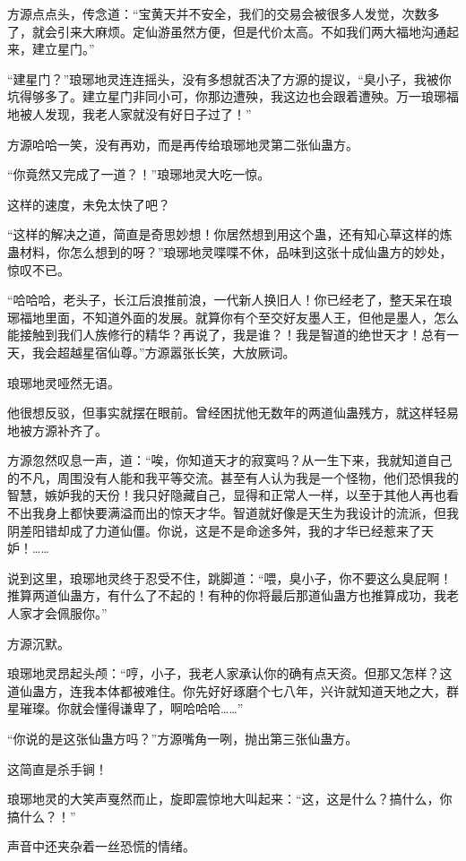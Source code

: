 \begin{this_body}
方源点点头，传念道：“宝黄天并不安全，我们的交易会被很多人发觉，次数多了，就会引来大麻烦。定仙游虽然方便，但是代价太高。不如我们两大福地沟通起来，建立星门。”

“建星门？”琅琊地灵连连摇头，没有多想就否决了方源的提议，“臭小子，我被你坑得够多了。建立星门非同小可，你那边遭殃，我这边也会跟着遭殃。万一琅琊福地被人发现，我老人家就没有好日子过了！”

方源哈哈一笑，没有再劝，而是再传给琅琊地灵第二张仙蛊方。

“你竟然又完成了一道？！”琅琊地灵大吃一惊。

这样的速度，未免太快了吧？

“这样的解决之道，简直是奇思妙想！你居然想到用这个蛊，还有知心草这样的炼蛊材料，你怎么想到的呀？”琅琊地灵喋喋不休，品味到这张十成仙蛊方的妙处，惊叹不已。

“哈哈哈，老头子，长江后浪推前浪，一代新人换旧人！你已经老了，整天呆在琅琊福地里面，不知道外面的发展。就算你有个至交好友墨人王，但他是墨人，怎么能接触到我们人族修行的精华？再说了，我是谁？！我是智道的绝世天才！总有一天，我会超越星宿仙尊。”方源嚣张长笑，大放厥词。

琅琊地灵哑然无语。

他很想反驳，但事实就摆在眼前。曾经困扰他无数年的两道仙蛊残方，就这样轻易地被方源补齐了。

方源忽然叹息一声，道：“唉，你知道天才的寂寞吗？从一生下来，我就知道自己的不凡，周围没有人能和我平等交流。甚至有人认为我是一个怪物，他们恐惧我的智慧，嫉妒我的天份！我只好隐藏自己，显得和正常人一样，以至于其他人再也看不出我身上都快要满溢而出的惊天才华。智道就好像是天生为我设计的流派，但我阴差阳错却成了力道仙僵。你说，这是不是命途多舛，我的才华已经惹来了天妒！……

说到这里，琅琊地灵终于忍受不住，跳脚道：“喂，臭小子，你不要这么臭屁啊！推算两道仙蛊方，有什么了不起的！有种的你将最后那道仙蛊方也推算成功，我老人家才会佩服你。”

方源沉默。

琅琊地灵昂起头颅：“哼，小子，我老人家承认你的确有点天资。但那又怎样？这道仙蛊方，连我本体都被难住。你先好好琢磨个七八年，兴许就知道天地之大，群星璀璨。你就会懂得谦卑了，啊哈哈哈……”

“你说的是这张仙蛊方吗？”方源嘴角一咧，抛出第三张仙蛊方。

这简直是杀手锏！

琅琊地灵的大笑声戛然而止，旋即震惊地大叫起来：“这，这是什么？搞什么，你搞什么？！”

声音中还夹杂着一丝恐慌的情绪。


\end{this_body}
